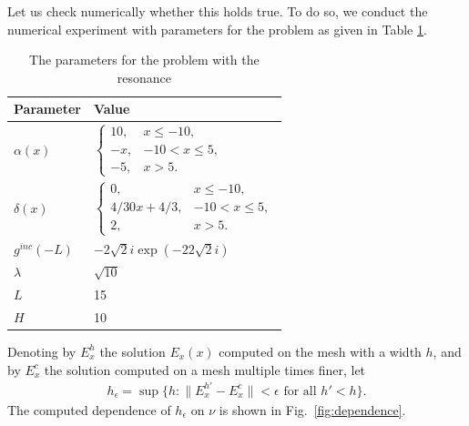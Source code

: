 Let us check numerically whether this holds true. 
To do so, we conduct the  numerical experiment with parameters for the problem as given in Table \ref{tab:parameters}.
\begin{table}
\begin{tabular}{l|l}
Parameter & Value \\
\hline
$\alpha(x)$ & $\left\{\begin{array}{lr}
10, & x\leq -10,\\
-x, & -10<x\leq 5,\\
-5, & x>5.
\end{array}\right.$ \\
$\delta(x)$ & 
$\left\{\begin{array}{lr}
0, & x\leq -10,\\
4/30x+4/3,& -10<x\leq 5,\\
2, & x>5.
\end{array}\right.$ \\
$g^{inc}(-L)$ & $-2 \sqrt{2}i\exp(-22\sqrt{2}i)$\\
$\lambda$ & 
$\sqrt{10}$\\
$L$& 15\\
$H$ & 10 \\
\end{tabular}
\caption{The parameters for the problem with the resonance}
\label{tab:parameters}
\end{table}
Denoting by $E_{x}^{h}$ the solution $E_{x}(x)$ computed on the mesh with a width $h$, and by $E_{x}^{c}$ the solution computed on a mesh multiple times finer, let 
\begin{align}
\label{eq:def_epsilon}
h_{\epsilon}=\sup\{h: \|E_{x}^{h'}-E_{x}^{c}\|<\epsilon \text{ for all } h'<h\}.
\end{align}
The computed dependence of $h_{\epsilon}$ on $\nu$ is shown in Fig.~\ref{fig:dependence}.
